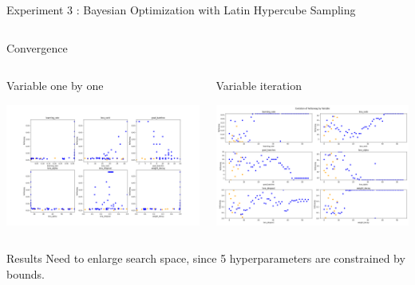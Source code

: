 \begin{frame}[allowframebreaks]{Experiment 3 : Bayesian Optimization with Latin Hypercube Sampling}
\begin{columns}
\begin{column}[t]{0.4\textwidth}
\begin{block}{Convergence}
            \end{block}  
            
        \end{column}
    \end{columns}    

    \framebreak
    
    \begin{columns}
    
        \begin{column}[t]{0.45\textwidth}
            \begin{block}{Variable one by one}
            
                \includegraphics[width = 7cm]{imgs/exp03/score_by_variable.png}
            
            \end{block}   
        \end{column}

        \begin{column}[t]{0.45\textwidth}
            \begin{block}{Variable iteration}
            
        \includegraphics[width = 7cm]{imgs/exp03/variable_over_time.png}
            
            \end{block}  
            
        \end{column}
    \end{columns}    

    \begin{block}{Results}
        Need to enlarge search space, since 5 hyperparameters are constrained by bounds.
    \end{block}
    
\end{frame}